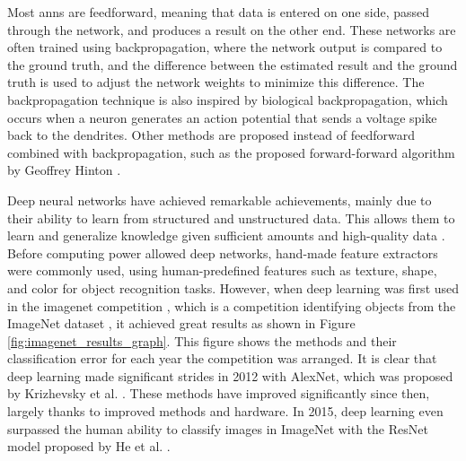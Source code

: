    
    
    Most \glspl{ann} are feedforward, meaning that data is entered on one side, passed through the network, and produces a result on the other end. These networks are often trained using backpropagation, where the network output is compared to the ground truth, and the difference between the estimated result and the ground truth is used to adjust the network weights to minimize this difference. The backpropagation technique is also inspired by biological backpropagation, which occurs when a neuron generates an action potential that sends a voltage spike back to the dendrites. Other methods are proposed instead of feedforward combined with backpropagation, such as the proposed forward-forward algorithm by Geoffrey Hinton \cite{hintonForwardForwardAlgorithmPreliminary2022}.


    Deep neural networks have achieved remarkable achievements, mainly due to their ability to learn from structured and unstructured data. This allows them to learn and generalize knowledge given sufficient amounts and high-quality data \cite{willeminkPreparingMedicalImaging2020}. Before computing power allowed deep networks, hand-made feature extractors were commonly used, using human-predefined features such as texture, shape, and color for object recognition tasks. However, when deep learning was first used in the \gls{imagenet} competition \cite{russakovskyImageNetLargeScale2015}, which is a competition identifying objects from the ImageNet dataset \cite{dengImageNetLargeScaleHierarchical2009}, it achieved great results as shown in Figure \ref{fig:imagenet_results_graph}. This figure shows the methods and their classification error for each year the competition was arranged. It is clear that deep learning made significant strides in 2012 with AlexNet, which was proposed by Krizhevsky et al. \cite{krizhevskyImageNetClassificationDeep2017}. These methods have improved significantly since then, largely thanks to improved methods and hardware. In 2015, deep learning even surpassed the human ability to classify images in ImageNet with the ResNet model proposed by He et al. \cite{heDeepResidualLearning2015, heDelvingDeepRectifiers2015}.
    
